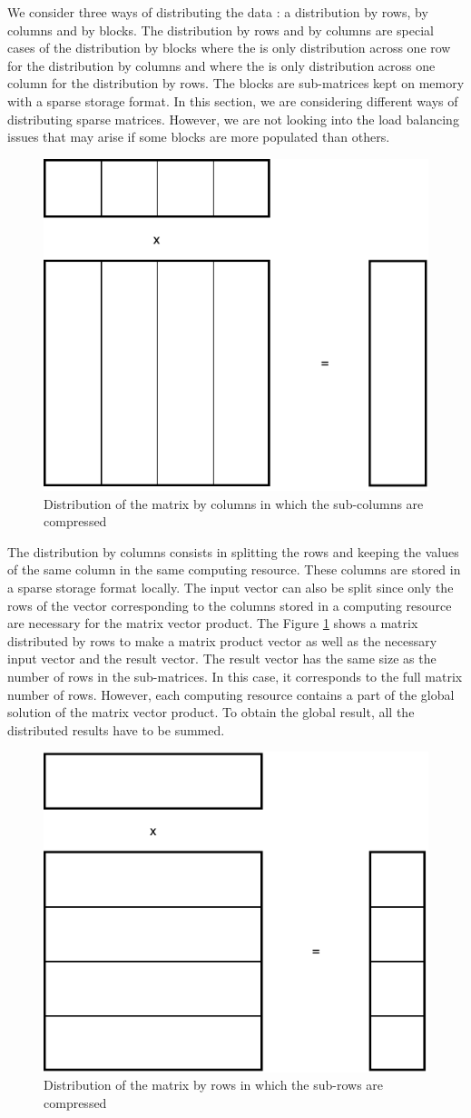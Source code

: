 We consider three ways of distributing the data : a distribution by rows, by columns and by blocks.
The distribution by rows and by columns are special cases of the distribution by blocks where the is only distribution across one row for the distribution by columns and where the is only distribution across one column for the distribution by rows.
The blocks are sub-matrices kept on memory with a sparse storage format.
In this section, we are considering different ways of distributing sparse matrices.
However, we are not looking into the load balancing issues that may arise if some blocks are more populated than others.


\begin{figure}[h]
	\centering
	\includegraphics[width=.5\textwidth]{pmv_c}
	\caption{Distribution of the matrix by columns in which the sub-columns are compressed \label{fig:sparse:pmv_c}}
\end{figure}

The distribution by columns consists in splitting the rows and keeping the values of the same column in the same computing resource.
These columns are stored in a sparse storage format locally.
The input vector can also be split since only the rows of the vector corresponding to the columns stored in a computing resource are necessary for the matrix vector product.
The Figure \ref{fig:sparse:pmv_c} shows a matrix distributed by rows to make a matrix product vector as well as the necessary input vector and the result vector.
The result vector has the same size as the number of rows in the sub-matrices.
In this case, it corresponds to the full matrix number of rows.
However, each computing resource contains a part of the global solution of the matrix vector product.
To obtain the global result, all the distributed results have to be summed.


\begin{figure}[h]
	\centering
	\includegraphics[width=.5\textwidth]{pmv_r}
	\caption{Distribution of the matrix by rows in which the sub-rows are compressed \label{fig:sparse:pmv_r}}
\end{figure}

